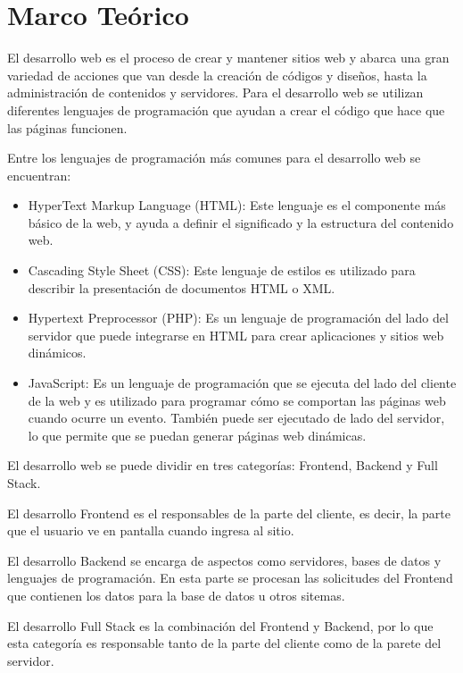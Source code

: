 \chapter{Marco Teórico}
El desarrollo web es el proceso de crear y mantener sitios web y abarca una gran variedad de acciones que van desde la creación de códigos y diseños, hasta la administración de contenidos y servidores. Para el desarrollo web se utilizan diferentes lenguajes de programación que ayudan a crear el código que hace que las páginas funcionen.

Entre los lenguajes de programación más comunes para el desarrollo web se encuentran:
    \begin{itemize}
        \item HyperText Markup Language (HTML): Este lenguaje es el componente más básico de la web, y ayuda a definir el significado y la estructura del   contenido web.
        \item Cascading Style Sheet (CSS): Este lenguaje de estilos es utilizado para describir la presentación de documentos HTML o XML.
        \item Hypertext Preprocessor (PHP): Es un lenguaje de programación del lado del servidor que puede integrarse en HTML para crear aplicaciones y sitios web dinámicos.
        \item JavaScript: Es un lenguaje de programación que se ejecuta del lado del cliente de la web y es utilizado para programar cómo se comportan las páginas web cuando ocurre un evento. También puede ser ejecutado de lado del servidor, lo que permite que se puedan generar páginas web dinámicas.
    \end{itemize}
El desarrollo web se puede dividir en tres categorías: Frontend, Backend y Full Stack.

El desarrollo Frontend es el responsables de la parte del cliente, es decir, la parte que el usuario ve en pantalla cuando ingresa al sitio.

El desarrollo Backend se encarga de aspectos como servidores, bases de datos y lenguajes de programación. En esta parte se procesan las solicitudes del Frontend que contienen los datos para la base de datos u otros sitemas.

El desarrollo Full Stack es la combinación del Frontend y Backend, por lo que esta categoría es responsable tanto de la parte del cliente como de la parete del servidor.


